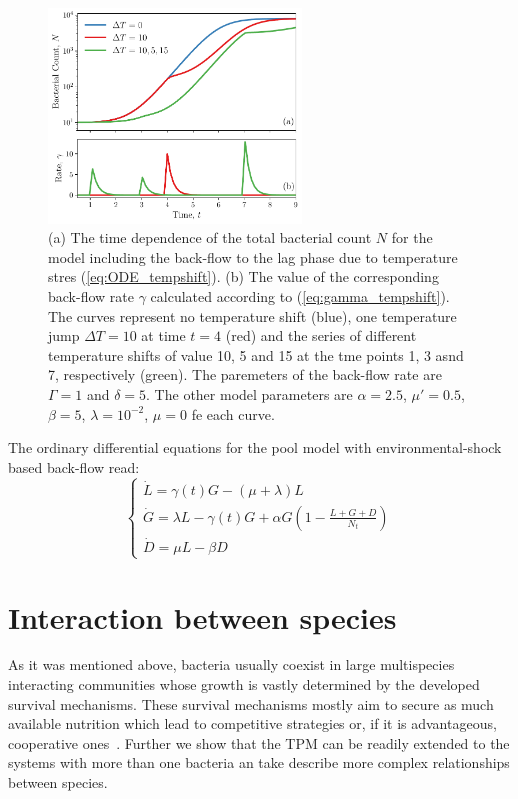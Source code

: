 \documentclass[10pt,A4paper]{article}
\begin{document}
\begin{figure}[t]
    \begin{center}
    \includegraphics[width=0.6\textwidth]{Figures/pool_model_3pools_resource_tempshift.pdf}
    \caption{{\footnotesize (a) The time dependence of the total bacterial count $N$ for the model including the back-flow to the lag phase due to temperature stres (\ref{eq:ODE_tempshift}).
    (b) The value of the corresponding back-flow rate $\gamma$ calculated according to (\ref{eq:gamma_tempshift}).
    The curves represent no temperature shift (blue), one temperature jump $\Delta T = 10$ at time $t=4$ (red) 
    and the series of different temperature shifts of value 10, 5 and 15 at the tme points 1, 3 asnd 7, respectively (green).
    The paremeters of the back-flow rate are $\Gamma=1$ and $\delta=5$.
    The other model parameters are $\alpha=2.5$, $\mu'=0.5$, $\beta=5$, $\lambda=10^{-2}$, $\mu = 0$ fe each curve.
    }}
    \label{fig:TempJump}
    \end{center}
\end{figure}
The ordinary differential equations for the pool model with environmental-shock based back-flow read:
\begin{equation}
    \begin{cases}
    \dot{L} =\gamma(t) G - (\mu + \lambda) L\\
    \dot{G} = \lambda L -\gamma(t) G + \alpha G\left(1-\frac{L+G+D}{N_t}\right)\\
    \dot{D} = \mu  L - \beta D
    \label{eq:ODE_tempshift}
    \end{cases}
\end{equation}
\newpage
%
%
\section{Interaction between species}
As it was mentioned above, bacteria usually coexist in large multispecies interacting communities whose growth is vastly determined by the developed survival mechanisms.
These survival mechanisms mostly aim to secure as much available nutrition which lead to competitive strategies or, if it is advantageous, cooperative ones~\cite{hibbing_bacterial_2010, stubbendieck_bacterial_2016}.
Further we show that the TPM can be readily extended to the systems with more than one bacteria an take describe more complex relationships between species. 
%
%
\end{document}
